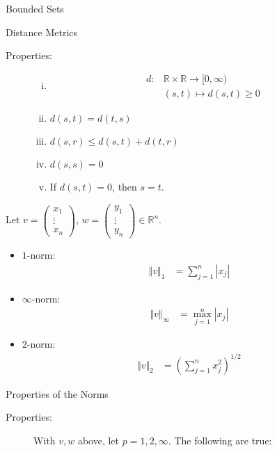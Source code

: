 \documentclass[8pt]{extarticle}
\newcommand{\R}{\mathbb{R}}
\begin{document}
\begin{problem}{Bounded Sets}
\begin{problem}{Distance Metrics}
      \begin{description}
        \item[Properties:]\hfill
          \begin{enumerate}[(i)]
            \item 
            \begin{align*}
              d: &\R \times \R \rightarrow [0,\infty)\\
                 &(s,t) \mapsto d(s,t) \geq 0
            \end{align*}
            \item $d(s,t) = d(t,s)$
            \item $d(s,r) \leq d(s,t) + d(t,r)$
            \item $d(s,s) = 0$
            \item If $d(s,t) = 0$, then $s = t$.
          \end{enumerate}
      \end{description}
      Let $v = \begin{pmatrix}x_1\\\vdots\\x_n\end{pmatrix}$, $ w = \begin{pmatrix}y_1\\\vdots\\y_n\end{pmatrix} \in \R^n$.
      \begin{itemize}
        \item  $1$-norm:
          \begin{align*}
            \Vert v \Vert_1 &= \sum_{j = 1}^{n} |x_j|
          \end{align*}
        \item $\infty$-norm:
          \begin{align*}
            \Vert v \Vert_{\infty} &= \max_{j=1}^{n} |x_j|
          \end{align*}
        \item $2$-norm:
          \begin{align*}
            \Vert v \Vert_2 &= \left(\sum_{j = 1}^{n} x_j^2\right)^{1/2}
          \end{align*}
      \end{itemize}
    \end{problem}
    \begin{problem}{Properties of the Norms}
      \begin{description}
        \item[Properties:] With $v,w$  above, let $p = 1,2,\infty$. The following are true:

\end{description}
\end{problem}
\end{problem}
\end{document}
